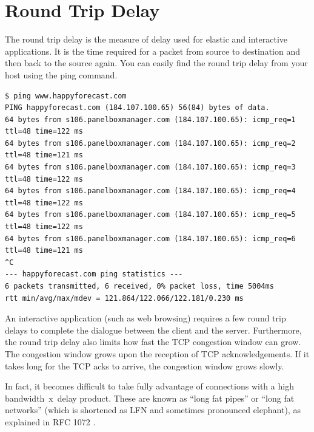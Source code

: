 \section{Round Trip Delay}

The round trip delay is the measure of delay used for elastic and interactive applications.
It is the time required for a packet from source to destination and then back to the source again.
You can easily find the round trip delay from your host using the ping command.

\begin{lstlisting}
$ ping www.happyforecast.com
PING happyforecast.com (184.107.100.65) 56(84) bytes of data.
64 bytes from s106.panelboxmanager.com (184.107.100.65): icmp_req=1 ttl=48 time=122 ms
64 bytes from s106.panelboxmanager.com (184.107.100.65): icmp_req=2 ttl=48 time=121 ms
64 bytes from s106.panelboxmanager.com (184.107.100.65): icmp_req=3 ttl=48 time=122 ms
64 bytes from s106.panelboxmanager.com (184.107.100.65): icmp_req=4 ttl=48 time=122 ms
64 bytes from s106.panelboxmanager.com (184.107.100.65): icmp_req=5 ttl=48 time=122 ms
64 bytes from s106.panelboxmanager.com (184.107.100.65): icmp_req=6 ttl=48 time=121 ms
^C
--- happyforecast.com ping statistics ---
6 packets transmitted, 6 received, 0% packet loss, time 5004ms
rtt min/avg/max/mdev = 121.864/122.066/122.181/0.230 ms
\end{lstlisting}

An interactive application (such as web browsing) requires a few round trip delays to complete the dialogue between the client and the server.
Furthermore, the round trip delay also limits how fast the TCP congestion window can grow.
The congestion window grows upon the reception of TCP acknowledgements.
If it takes long for the TCP acks to arrive, the congestion window grows slowly.

In fact, it becomes difficult to take fully advantage of connections with a high \mbox{bandwidth x delay} product.
These are known as ``long fat pipes'' or ``long fat networks'' (which is shortened as LFN and sometimes pronounced elephant), as explained in RFC 1072 \cite{rfc1072}.
